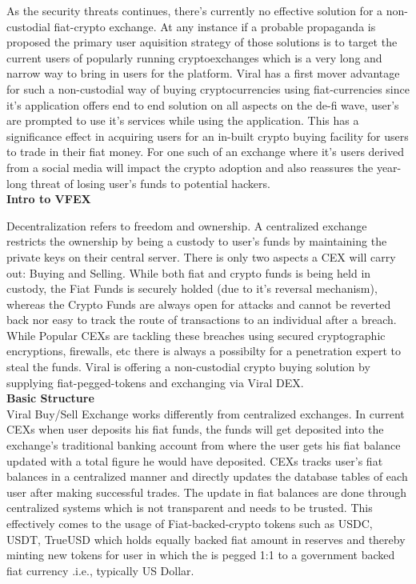 \documentclass[10pt]{article}
\begin{document}
As the security threats continues, there's currently no effective solution for a non-custodial fiat-crypto exchange. At any instance if a probable propaganda is proposed the primary user aquisition strategy of those solutions is to target the current users of popularly running cryptoexchanges which is a very long and narrow way to bring in users for the platform. Viral has a first mover advantage for such a non-custodial way of buying cryptocurrencies using fiat-currencies since it's application offers end to end solution on all aspects on the de-fi wave, user's are prompted to use it's services while using the application. This has a significance effect in acquiring users for an in-built crypto buying facility for users to trade in their fiat money. For one such of an exchange where it's users derived from a social media will impact the crypto adoption and also reassures the year-long threat of losing user's funds to potential hackers.\\

\textbf{Intro to VFEX}

Decentralization refers to freedom and ownership. A centralized exchange restricts the ownership by being a custody to user's funds by maintaining the private keys on their central server. There is only two aspects a CEX will carry out: Buying and Selling. While both fiat and crypto funds is being held in custody, the Fiat Funds is securely holded (due to it's reversal mechanism), whereas the Crypto Funds are always open for attacks and cannot be reverted back nor easy to track the route of transactions to an individual after a breach. While Popular CEXs are tackling these breaches using secured cryptographic encryptions, firewalls, etc there is always a possibilty for a penetration expert to steal the funds. Viral is offering a non-custodial crypto buying solution by supplying fiat-pegged-tokens and exchanging via Viral DEX.\\

\textbf{Basic Structure}\\

Viral Buy/Sell Exchange works differently from centralized exchanges. In current CEXs when user deposits his fiat funds, the funds will get deposited into the exchange's traditional banking account from where the user gets his fiat balance updated with a total figure he would have deposited. CEXs tracks user's fiat balances in a centralized manner and directly updates the database tables of each user after making successful trades. The update in fiat balances are done through centralized systems which is not transparent and needs to be trusted. This effectively comes to the usage of Fiat-backed-crypto tokens such as USDC, USDT, TrueUSD which holds equally backed fiat amount in reserves and thereby minting new tokens for user in which the is pegged 1:1 to a government backed fiat currency .i.e., typically US Dollar.\\
\end{document}
